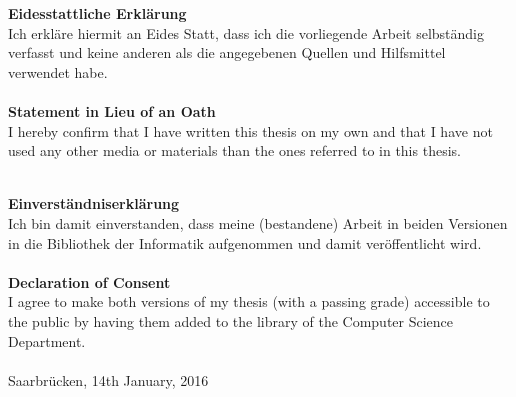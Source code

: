 \textbf{Eidesstattliche Erklärung}
\\

Ich erkläre hiermit an Eides Statt, dass ich die vorliegende Arbeit selbständig verfasst und keine anderen als die angegebenen Quellen und Hilfsmittel verwendet habe.
\\\\

\textbf{Statement in Lieu of an Oath}
\\

I hereby confirm that I have written this thesis on my own and that I have not
used any other media or materials than the ones referred to in this thesis.
\\\\

\monthword{\month} \the\year

\vspace{5cm}

\textbf{Einverständniserklärung}
\\

Ich bin damit einverstanden, dass meine (bestandene) Arbeit in beiden Versionen
in die Bibliothek der Informatik aufgenommen und damit veröffentlicht wird.
\\\\

\textbf{Declaration of Consent}
\\

I agree to make both versions of my thesis (with a passing grade) accessible to the
public by having them added to the library of the Computer Science Department.
\\\\

Saarbrücken, 14th January, 2016